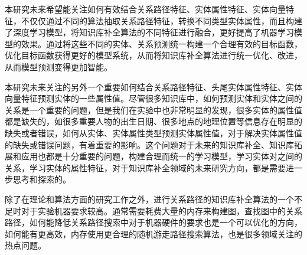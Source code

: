 本研究未来希望能关注如何有效结合关系路径特征、实体属性特征、实体向量特征，不仅仅通过不同的算法抽取关系路径特征，转换不同类型实体属性，而且构建了深度学习模型，将知识库补全算法的不同特征进行融合，更好提高了机器学习模型的效果。通过将这些不同的实体、关系预测统一构建一个合理有效的目标函数，优化目标函数获得更好的模型系统，从而将知识库补全算法进行统一优化、改进，从而模型预测变得更加智能。

本研究未来关注的另外一个重要如何结合关系路径特征、头尾实体属性特征、实体向量特征预测实体的一些属性值。尽管很多知识库中，如何预测实体和实体之间的关系是一个重要的问题，但是我们在实验中也非常明显的发现，很多实体的属性值都是缺失的，如很多重要人物的出生日期、很多地点的地理位置等信息存在明显的缺失或者错误，如何从实体、实体属性类型预测实体属性值，对于解决实体属性值的缺失或错误问题，有着重要的影响。这个问题对于未来的知识库补全、知识库拓展和应用也都是十分重要的问题，构建合理而统一的学习模型，学习实体对之间的关系，学习实体的属性特征，对于知识库补全领域的未来研究方向，都是需要进一步思考和探索的。

除了在理论和算法方面的研究工作之外，进行关系路径的知识库补全算法的一个不足时对于实验机器要求较高。通常需要耗费大量的内存来构建图，查找图中的关系路径，如何能降低关系路径搜索中对于机器硬件的要求也是一个可以优化的方向，如何能有更高效，内存使用更合理的随机游走路径搜索算法，也是很多领域关注的热点问题。 